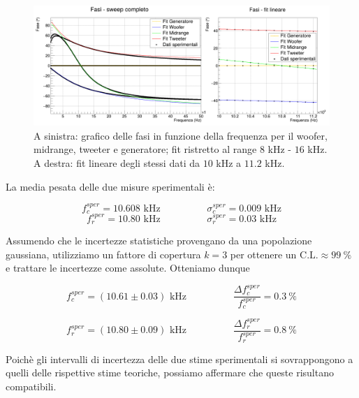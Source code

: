 \documentclass[12pt,italian]{article}
\begin{document}
\begin{figure}[h]
	\centering
	\includegraphics[width=\textwidth]{fig_fase.png}
	\caption{A sinistra: grafico delle fasi in funzione della frequenza per il woofer, midrange, tweeter e generatore;
		fit ristretto al range $8$ kHz - $16$ kHz. A destra: fit lineare degli stessi dati da $10$ kHz a $11.2$ kHz.}\label{fig:phase_sweep}
\end{figure}

La media pesata delle due misure sperimentali è:

\begin{equation*}
	f_{c}^{sper} = 10.608 \text{ kHz}  \hspace{2cm}  \sigma_c^{sper} = 0.009 \text{ kHz}
\end{equation*}
\begin{equation*}
	f_{r}^{sper} = 10.80 \text{ kHz}  \hspace{2cm}  \sigma_r^{sper} = 0.03  \text{ kHz}
\end{equation*}

\noindent
Assumendo che le incertezze statistiche provengano da una popolazione
gaussiana, utilizziamo un fattore di copertura $k = 3$ per ottenere un
$\text{C.L.}\approx 99 \ \% $ e trattare le incertezze come assolute. Otteniamo
dunque

\begin{equation*}
	f_{c}^{sper} = (10.61 \pm 0.03) \text{ kHz} \hspace{2cm} \frac{\Delta f_{c}^{sper}}{f_{c}^{sper}} = 0.3 \ \%
\end{equation*}

\begin{equation*}
	f_{r}^{sper} = (10.80 \pm 0.09) \text{ kHz} \hspace{2cm} \frac{\Delta f_{r}^{sper}}{f_{r}^{sper}} = 0.8 \ \%
\end{equation*}

\noindent
Poichè gli intervalli di incertezza delle due stime sperimentali si
sovrappongono a quelli delle rispettive stime teoriche, possiamo affermare che
queste risultano compatibili.
\end{document}
